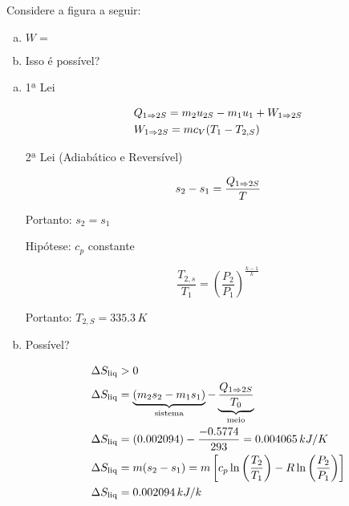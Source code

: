 \documentclass[a4paper,12pt]{memoir}
\begin{document}
\begin{Exerc}[8.135 6\pa Ed.]
Considere a figura a seguir:


\begin{enumerate}[a)]
 \item $W =$
 \item Isso é possível?
\end{enumerate}
\end{Exerc}

\begin{sol}

\begin{enumerate}[a)]
 \item 1ª Lei

\[
\begin{gathered}
  Q_{1 \imp 2S} = m_2 u_{2S} - m_1 u_1 + W_{1 \imp 2S} \hfill \\
  W_{1 \imp 2S} = mc_V (T_1 - T_{2,S}) \hfill \\ 
\end{gathered} 
\]

2ª Lei (Adiabático e Reversível)

\[
s_2 - s_1 = \frac{Q_{1 \Rightarrow 2S}}{T}
\]

Portanto: $s_2 = s_1$

Hipótese: $c_p$ constante

\[
\frac{T_{2,s}}{T_1} = \left( \frac{P_2}{P_1} \right)^{\frac{k-1}{k}}
\]

Portanto: $T_{2,S} = 335.3\,K$

 \item Possível?

\[
\begin{gathered}
  \Delta S_{\operatorname{liq}} > 0 \hfill \\
  \Delta S_{\operatorname{liq}} = \ubrace{(m_2 s_2 - m_1 s_1)}{\text{sistema}} - \ubrace{\frac{Q_{1 \imp 2S}}{T_0}}{\text{meio}} \hfill \\ 
  \Delta S_{\operatorname{liq}} = (0.002094) - \frac{-0.5774}{293} = 0.004065\,kJ/K \hfill \\
  \Delta S_{\operatorname{liq}} = m(s_2 - s_1) = m \left[ c_p \ln \left( \frac{T_2}{T_1} \right) - R \ln \left( \frac{P_2}{P_1} \right)\right] \hfill \\
  \Delta S_{\operatorname{liq}} = 0.002094\,kJ/k \hfill \\
\end{gathered} 
\]

\end{enumerate}
\end{sol}
\end{document}
